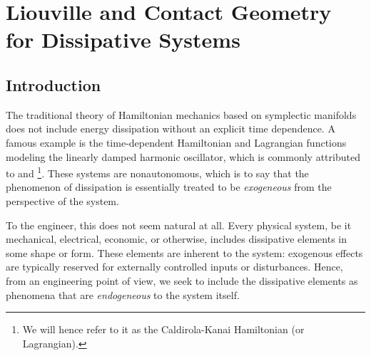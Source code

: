 \chapter{Liouville and Contact Geometry for Dissipative Systems}
\label{chap:contact_mechanics} 
\section{Introduction}
\label{sec:contact_intro}
The traditional theory of Hamiltonian mechanics based on symplectic manifolds does not include energy dissipation without an explicit time dependence. A famous example is the time-dependent Hamiltonian and Lagrangian functions modeling the linearly damped harmonic oscillator, which is commonly attributed to \citet{Caldirola1941} and \citet{Kanai1948}\footnote{We will hence refer to it as the Caldirola-Kanai Hamiltonian (or Lagrangian).}. 
These systems are nonautonomous, which is to say that the phenomenon of dissipation is essentially treated to be \emph{exogeneous} from the perspective of the system.  

To the engineer, this does not seem natural at all. Every physical system, be it mechanical, electrical, economic, or otherwise, includes dissipative elements in some shape or form. These elements are inherent to the system: exogenous effects are typically reserved for externally controlled inputs or disturbances. Hence, from an engineering point of view, we seek to include the dissipative elements as phenomena that are \emph{endogeneous} to the system itself.

